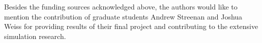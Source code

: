 \documentclass{ifacconf}
\begin{document}
\begin{ack}                               %
Besides the funding sources acknowledged above, the authors would like to
mention the contribution of graduate students Andrew Streenan and Joshua
Weiss for providing results of their final project and contributing to the
extensive simulation research.
\end{ack}



\end{document}
